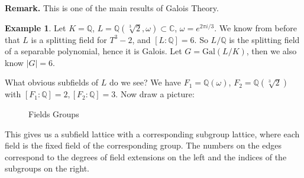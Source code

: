 \documentclass{article}
\theoremstyle{definition}
\newtheorem{example}{Example}[section]
\begin{document}
\textbf{Remark.} This is one of the main results of Galois Theory.
\begin{example}
    Let $K = \mathbb{Q}$, $L = \mathbb{Q}(\sqrt[3]{2},\omega) \subset \mathbb{C}$, $\omega = e^{2 \pi i /3}$. We know from before that $L$ is a splitting field for $T^3-2$, and $[L:\mathbb{Q}]=6$. So $L/\mathbb{Q}$ is the splitting field of a separable polynomial, hence it is Galois. Let $G = \text{Gal}(L/K)$, then  we also know $|G|=6$.
    \vspace{1mm}
    
    What obvious subfields of $L$ do we see? We have $F_1 = \mathbb{Q}(\omega)$, $F_2 = \mathbb{Q}(\sqrt[3]{2})$ with $[F_1 : \mathbb{Q}] = 2, [F_2 : \mathbb{Q}] = 3$. Now draw a picture:

    \begin{figure}[H]
        \centering
        \captionsetup{labelformat=empty}
    \caption{\hspace{6mm} Fields \hspace{35mm} Groups}
    \end{figure}

    This gives us a subfield lattice with a corresponding subgroup lattice, where each field is the fixed field of the corresponding group. The numbers on the edges correspond to the degrees of field extensions on the left and the indices of the subgroups on the right.
    \vspace{1mm}
    

\end{example}
\end{document}
